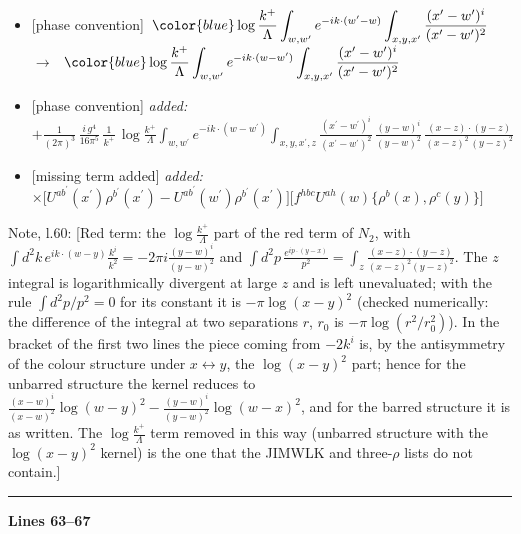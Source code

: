 \documentclass[10pt]{article}
\newenvironment{notebox}{\def\FrameCommand{{\color{notebar}\vrule width 1.5pt}\hspace{6pt}}\MakeFramed{\advance\hsize-\width\FrameRestore}\small}{\endMakeFramed}
\begin{document}
\begin{itemize}[leftmargin=2.2em,itemsep=1pt,topsep=2pt]
\item[\textbf{l.58}] \textsf{\small [phase convention]} $\displaystyle \,{\color{blue}\log\frac{k^{+}}{\Lambda}}\int_{w,w'} e^{-ik\cdot(w'-w)}\int_{x,y,x'}\frac{(x'-w')^{i}}{(x'-w')^{2}}$\ $\longrightarrow$\ $\displaystyle \,{\color{blue}\log\frac{k^{+}}{\Lambda}}\int_{w,w'} e^{-ik\cdot(w-w')}\int_{x,y,x'}\frac{(x'-w')^{i}}{(x'-w')^{2}}$
\item[\textbf{l.59}] \textsf{\small [phase convention]} \emph{added:} $\displaystyle +\frac{1}{(2\pi)^{3}}\,\frac{i\,g^{4}}{16\pi^{5}}\,\frac{1}{k^{+}}\,\log\frac{k^{+}}{\Lambda}\int_{w,w^{\prime}} e^{-ik\cdot(w-w^{\prime})}\int_{x,y,x^{\prime},z}\frac{(x^{\prime}-w^{\prime})^{i}}{(x^{\prime}-w^{\prime})^{2}}\,\frac{(y-w)^{i}}{(y-w)^{2}}\,\frac{(x-z)\cdot(y-z)}{(x-z)^{2}\,(y-z)^{2}}$
\item[\textbf{l.59}] \textsf{\small [missing term added]} \emph{added:} $\displaystyle \times\Big[U^{ab^{\prime}}(x^{\prime})\rho^{b^{\prime}}(x^{\prime})-U^{ab^{\prime}}(w^{\prime})\rho^{b^{\prime}}(x^{\prime})\Big]\Big[f^{hbc}U^{ah}(w)\{\rho^{b}(x),\rho^{c}(y)\}\Big]$
\end{itemize}
\begin{notebox}\textsf{\small Note, l.60:} [Red term: the $\log\frac{k^{+}}{\Lambda}$ part of the red term of $N_{2}$, with $\int d^{2}k\,e^{ik\cdot(w-y)}\frac{k^{i}}{k^{2}}=-2\pi i\frac{(y-w)^{i}}{(y-w)^{2}}$ and $\int d^{2}p\,\frac{e^{ip\cdot(y-x)}}{p^{2}}=\int_{z}\frac{(x-z)\cdot(y-z)}{(x-z)^{2}(y-z)^{2}}$. The $z$ integral is logarithmically divergent at large $z$ and is left unevaluated; with the rule $\int d^{2}p/p^{2}=0$ for its constant it is $-\pi\log(x-y)^{2}$ (checked numerically: the difference of the integral at two separations $r$, $r_{0}$ is $-\pi\log(r^{2}/r_{0}^{2})$). In the bracket of the first two lines the piece coming from $-2k^{i}$ is, by the antisymmetry of the colour structure under $x\leftrightarrow y$, the $\log(x-y)^{2}$ part; hence for the unbarred structure the kernel reduces to $\frac{(x-w)^{i}}{(x-w)^{2}}\log(w-y)^{2}-\frac{(y-w)^{i}}{(y-w)^{2}}\log(w-x)^{2}$, and for the barred structure it is as written. The $\log\frac{k^{+}}{\Lambda}$ term removed in this way (unbarred structure with the $\log(x-y)^{2}$ kernel) is the one that the JIMWLK and three-$\rho$ lists do not contain.]\end{notebox}
\noindent\rule{\linewidth}{0.3pt}\par\noindent\textbf{Lines 63--67} \par
\end{document}
